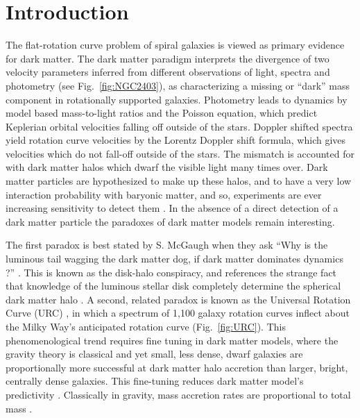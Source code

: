 \documentclass[reprint,%
 amsmath,amssymb,
 aps,
]{revtex4-1}
\begin{document}
\section{Introduction  \label{sec:uno}}



 The flat-rotation curve problem of spiral galaxies  is viewed as primary evidence for dark matter\cite{Rub,Bosma,1985ApJAlbada}. 
 The dark matter paradigm interprets the divergence of two velocity parameters inferred from  different    observations of light, spectra and photometry (see Fig.~\ref{fig:NGC2403}),     as characterizing a missing or ``dark'' mass component in rotationally supported galaxies. 
 Photometry leads to dynamics by model based mass-to-light ratios and the Poisson equation, which predict Keplerian orbital velocities    falling off outside of the stars. 
 Doppler shifted spectra yield rotation curve velocities  by the Lorentz Doppler shift formula, which gives velocities which do not fall-off outside of the stars. 
 The mismatch is accounted for with dark matter halos which dwarf the visible light many times over. 
 Dark matter particles are hypothesized to make up these halos, and to have a very low interaction probability with baryonic matter,  and so,  experiments are ever increasing   sensitivity to detect them \cite{Cebrian:2022brv}.  In the absence of a direct detection of a dark matter particle the paradoxes of dark matter models remain interesting. 
 
   
   The first paradox is best stated by 
  S. McGaugh  when they ask   ``Why is the luminous tail wagging the dark matter dog,  if dark matter dominates dynamics ?'' \cite{1999McGaugh,McGaugh2016RAR}. This is known as the  disk-halo conspiracy, and references the strange fact that knowledge  of 
 the luminous stellar   disk  completely determine the spherical dark matter halo \cite{2004ApJ...609..652M}.  
 A second, related paradox  is known as  the Universal Rotation Curve (URC)  \cite{salucci,Persic,1978Rubin,10.1111/j.1365-2966.2007.11696.x}, in which  a spectrum of 1,100 galaxy rotation curves
 inflect  about  the Milky Way's  anticipated rotation curve (Fig.~\ref{fig:URC}).  This phenomenological trend requires   fine tuning in dark matter models, where the gravity theory is   classical and yet
  small, less dense,  dwarf galaxies are proportionally more successful at dark matter halo accretion than     larger, bright,  centrally dense    galaxies. 
   This fine-tuning reduces dark matter model's   
   predictivity   \cite{MCGAUGH2021220}. 
 Classically in gravity,  mass accretion rates are proportional to total mass \cite{10.1093/mnras/stt2403}. 
\end{document}
